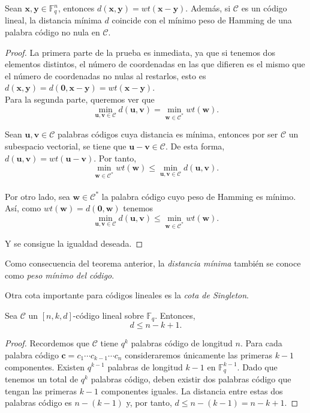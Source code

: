 \begin{teorema}\label{th:wp}
Sean $\mathbf{x,y} \in \mathds{F}_{q}^n$, entonces $d(\mathbf{x,y}) = wt(\mathbf{x-y})$. Además, si $\mathcal{C}$ es un código lineal, la distancia mínima $d$ coincide con el mínimo peso de Hamming de una palabra código no nula en $\mathcal{C}$.
\end{teorema}

\begin{proof}
La primera parte de la prueba es inmediata, ya que si tenemos dos elementos distintos, el número de coordenadas en las que difieren es el mismo que el número de coordenadas no nulas al restarlos, esto es $d(\mathbf{x,y}) = d(\mathbf{0,x-y}) = wt(\mathbf{x-y})$.
\\
Para la segunda parte, queremos ver que $$\min_{\mathbf{u,v} \in \mathcal{C}}{d(\mathbf{u,v})} = \min_{\mathbf{w}  \in \mathcal{C^*}}{wt(\mathbf{w})}.$$

Sean $\mathbf{u,v} \in \mathcal{C}$ palabras códigos cuya distancia es mínima, entonces por ser $\mathcal{C}$ un subespacio vectorial, se tiene que $\mathbf{u-v} \in \mathcal{C}$. De esta forma, $d(\mathbf{u,v}) = wt(\mathbf{u-v})$. Por tanto, $$\min_{\mathbf{w}  \in \mathcal{C^*}}{wt(\mathbf{w})} \leq \min_{\mathbf{u,v} \in \mathcal{C}}{d(\mathbf{u,v})}.$$
\\
Por otro lado, sea $\mathbf{w} \in \mathcal{C^*}$ la palabra código cuyo peso de Hamming es mínimo. Así, como $wt(\mathbf{w}) = d(\mathbf{0,w})$ tenemos
$$\min_{\mathbf{u,v} \in \mathcal{C}}{d(\mathbf{u,v})} \leq \min_{\mathbf{w} \in \mathcal{C^*}}{wt(\mathbf{w})}.$$

Y se consigue la igualdad deseada.
\end{proof}

Como consecuencia del teorema anterior, la \emph{distancia mínima} también se conoce como \emph{peso mínimo del código}.

Otra cota importante para códigos lineales es la \emph{cota de Singleton}.

\begin{teorema}\label{th:cotaS}
Sea $\mathcal{C}$ un $[n,k,d]$-código lineal sobre $\mathbb{F}_q$. Entonces, $$ d \leq n - k + 1.$$
\end{teorema}

\begin{proof}
Recordemos que $\mathcal{C}$ tiene $q^k$ palabras código de longitud $n$. Para cada palabra código $\mathbf{c} = c_1\cdots c_{k-1}\cdots c_n$ consideraremos 
únicamente las primeras $k-1$ componentes. Existen $q^{k-1}$ palabras de longitud $k-1$ en $\mathbb{F}_q^{k-1}$. Dado que tenemos un total de $q^k$ palabras código, deben existir dos palabras código que tengan las primeras $k-1$ componentes iguales. La distancia entre estas dos palabras código es $n - (k-1)$ y, por tanto, $d \leq n - (k - 1) = n - k + 1$.
\end{proof}

